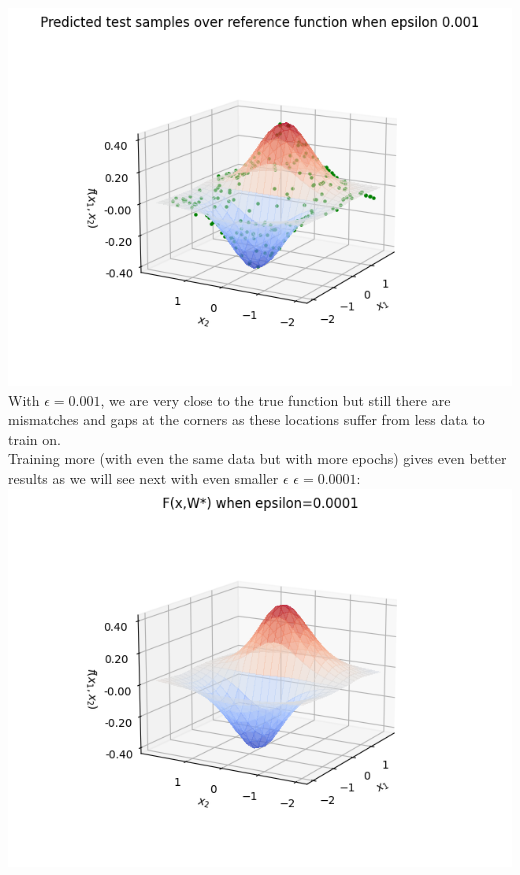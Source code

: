 \documentclass[12pt]{article}
\begin{document}
\includegraphics{model_test_over_ref_func_2.png}\\
With $\epsilon=0.001$, we are very close to the true function but still there are mismatches and gaps at the corners as these locations suffer from less data to train on.\\ Training more (with even the same data but with more epochs) gives even better results as we will see next with even smaller $\epsilon$
\newpage
$\epsilon=0.0001$:\\
\includegraphics{model_approx_epsilon_3.png}\\
\end{document}
